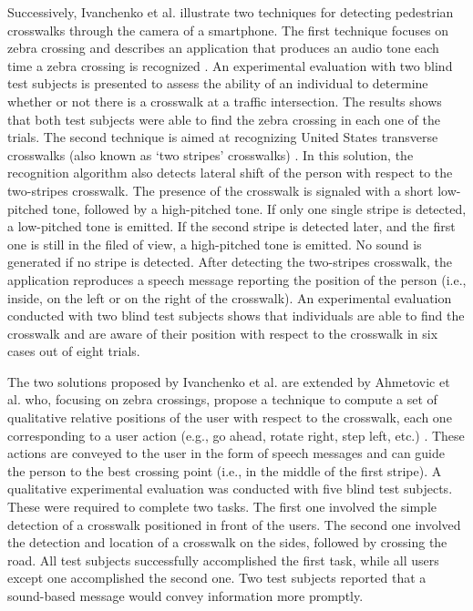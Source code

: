 \documentclass{article}
\begin{document}
Successively, Ivanchenko et al. illustrate two techniques for detecting pedestrian crosswalks through the camera of a smartphone.
The first technique focuses on zebra crossing and describes an application that produces an audio tone each time a zebra crossing is recognized \cite{ivanchenko}.
An experimental evaluation with two blind test subjects is presented to assess the ability of an individual to determine whether or not there is a crosswalk at a traffic intersection.
The results shows that both test subjects were able to find the zebra crossing in each one of the  trials.
The second technique is aimed at recognizing United States transverse crosswalks (also known as `two stripes' crosswalks) \cite{ivanchenko2}.
In this solution, the recognition algorithm also detects lateral shift of the person with respect to the two-stripes crosswalk.
The presence of the crosswalk is signaled with a short low-pitched tone, followed by a high-pitched tone. If only one single stripe is detected, a low-pitched tone is emitted. If the second stripe is detected later, and the first one is still in the filed of view, a high-pitched tone is emitted. No sound is generated if no stripe is detected.
After detecting the two-stripes crosswalk, the application reproduces a speech message reporting the position of the person (i.e., inside, on the left or on the right of the crosswalk).
An experimental evaluation conducted with two blind test subjects shows that individuals are able to find the crosswalk and are aware of their position with respect to the crosswalk in six cases out of eight trials.

The two solutions proposed by Ivanchenko et al. are extended by Ahmetovic et al. who, focusing on zebra crossings, propose a technique to compute a set of  qualitative relative positions of the user with respect to the crosswalk, each one corresponding to a user action (e.g., go ahead, rotate right, step left, etc.) \cite{dragan}.
These actions are conveyed to the user in the form of speech messages and can guide the person to the best crossing point (i.e., in the middle of the first stripe).
A qualitative experimental evaluation was conducted with five blind test subjects. These were required to complete two tasks. The first one involved the simple detection of a crosswalk positioned in front of the users. The second one involved the detection and location of a crosswalk on the sides, followed by crossing the road.
All test subjects successfully accomplished the first task, while all users except one accomplished the second one.
Two test subjects reported that a sound-based message would convey information more promptly.
\end{document}
